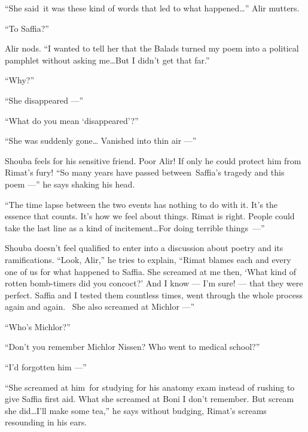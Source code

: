 \documentclass[twoside,11pt,openany]{book}
\begin{document}
``She said~it was these kind of words that led to what happened{\ldots}'' Alir mutters.

``To Saffia?''

Alir nods. ``I wanted to tell her that the Balads turned my poem into a political pamphlet without asking
me{\ldots}But I didn't get that far.''

``Why?''

``She disappeared ---''

``What do you mean `disappeared'?''

``She was suddenly gone{\ldots} Vanished into thin air ---''

Shouba feels for his sensitive friend. Poor Alir! If only he could protect him from Rimat's fury! ``So many
years have passed between~Saffia's tragedy and this poem ---'' he says shaking his head.

``The time lapse between the two events has nothing to do with it. It's the essence that counts. It's how
we feel about things. Rimat is right. People could take the last line as a kind of incitement{\ldots}For doing terrible
things~---''

Shouba doesn't feel qualified to enter into a discussion about poetry and its{ }ramifications.  ``Look,
Alir,'' he tries to explain, ``Rimat blames each and every one of us for what happened to
Saffia. She screamed at me then, `What kind of rotten bomb-timers did you concoct?' And I know --- I'm sure! --- that they
were perfect. Saffia and I tested them countless times, went through the whole process again and again. ~She also
screamed at Michlor ---''

``Who's Michlor?''

``Don't you remember Michlor Nissen? Who went to medical school?''

``I'd forgotten him ---''

``She screamed at him~for studying for his anatomy exam instead of rushing to give Saffia first aid. What
she screamed at Boni I don't remember. But scream she did{\ldots}I'll make some tea,'' he says without
budging, Rimat's screams resounding in his ears.
\end{document}
